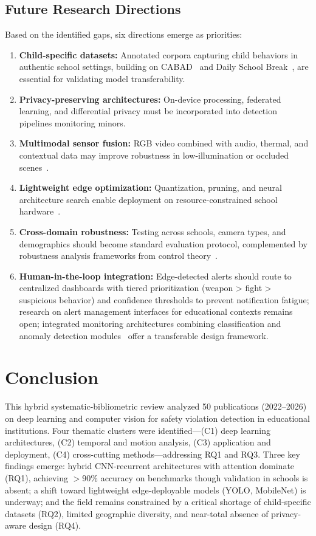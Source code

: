 \documentclass[conference]{IEEEtran}
\begin{document}
\subsection{Future Research Directions}

Based on the identified gaps, six directions emerge as priorities:
\begin{enumerate}
\item \textbf{Child-specific datasets:} Annotated corpora capturing child behaviors in authentic school settings, building on CABAD~\cite{b15} and Daily School Break~\cite{b11}, are essential for validating model transferability.
\item \textbf{Privacy-preserving architectures:} On-device processing, federated learning, and differential privacy must be incorporated into detection pipelines monitoring minors.
\item \textbf{Multimodal sensor fusion:} RGB video combined with audio, thermal, and contextual data may improve robustness in low-illumination or occluded scenes~\cite{b21,b22}.
\item \textbf{Lightweight edge optimization:} Quantization, pruning, and neural architecture search enable deployment on resource-constrained school hardware~\cite{b7,b23}.
\item \textbf{Cross-domain robustness:} Testing across schools, camera types, and demographics should become standard evaluation protocol, complemented by robustness analysis frameworks from control theory~\cite{b25}.
\item \textbf{Human-in-the-loop integration:} Edge-detected alerts should route to centralized dashboards with tiered prioritization (weapon > fight > suspicious behavior) and confidence thresholds to prevent notification fatigue; research on alert management interfaces for educational contexts remains open; integrated monitoring architectures combining classification and anomaly detection modules~\cite{b24} offer a transferable design framework.
\end{enumerate}

\section{Conclusion}

This hybrid systematic-bibliometric review analyzed 50 publications (2022--2026) on deep learning and computer vision for safety violation detection in educational institutions. Four thematic clusters were identified---(C1) deep learning architectures, (C2) temporal and motion analysis, (C3) application and deployment, (C4) cross-cutting methods---addressing RQ1 and RQ3. Three key findings emerge: hybrid CNN-recurrent architectures with attention dominate (RQ1), achieving $>$90\% accuracy on benchmarks though validation in schools is absent; a shift toward lightweight edge-deployable models (YOLO, MobileNet) is underway; and the field remains constrained by a critical shortage of child-specific datasets (RQ2), limited geographic diversity, and near-total absence of privacy-aware design (RQ4).
\end{document}
